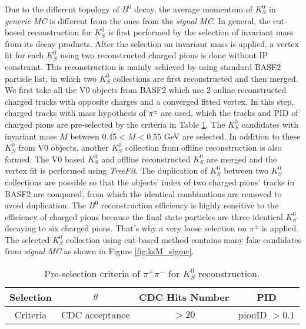 Due to the different topology of $B^0$ decay, the average momentum of $K_S^0$ in \textit{generic MC} is different from the ones from the \textit{signal MC}. In general, the cut-based reconstruction for $K_S^0$ is first performed by the selection of invariant mass from its decay products. After the selection on invariant mass is applied, a vertex fit for each $K_S^0$ using two reconstructed charged pions is done without IP constraint. This reconstruction is mainly achieved by using standard BASF2 particle list, in which two $K_S^0$ collections are first reconstructed and then merged. We first take all the V0 objects from BASF2 which use 2 online reconstructed charged tracks with opposite charges and a converged fitted vertex. In this step, charged tracks with mass hypothesis of $\pi^{\pm}$ are used, which the tracks and PID of charged pions are pre-selected by the criteria in Table \ref{tab:kspipi_select}. The $K_S^0$ candidates with invariant mass $M$ between $0.45 < M < 0.55$ GeV are selected. In addition to these $K_S^0$ from V0 objects, another $K_S^0$ collection from offline reconstruction is also formed. The V0 based $K_S^0$ and offline reconstructed $K_S^0$ are merged and the vertex fit is performed using \textit{TreeFit}\cite{krohn2020global}. The duplication of $K_S^0$ between two $K_S^0$ collections are possible so that the objects' index of two charged pions' tracks in BASF2 are compared, from which the identical combinations are removed to avoid duplication. The $B^0$ reconstruction efficiency is highly sensitive to the efficiency of charged pions because the final state particles are three identical $K_S^0$ decaying to six charged pions. That's why a very loose selection on $\pi^{\pm}$ is applied. The selected $K_S^0$ collection using cut-based method contains many fake candidates from \textit{signal MC} as shown in Figure \ref{fig:ksM_sigmc}.
\begin{table}[htbp]
	\centering
	\large
	\caption{Pre-selection criteria of $\pi^+ \pi^-$ for $K_S^0$ reconstruction.}
	\label{tab:kspipi_select}
	\begin{tabular}{c c c c }
		\toprule
		Selection & $\theta$ & CDC Hits Number & PID  \\
		\hline
		Criteria  & CDC acceptance &  $>20$ & pionID $> 0.1$\\
		\bottomrule
	\end{tabular}
\end{table}

